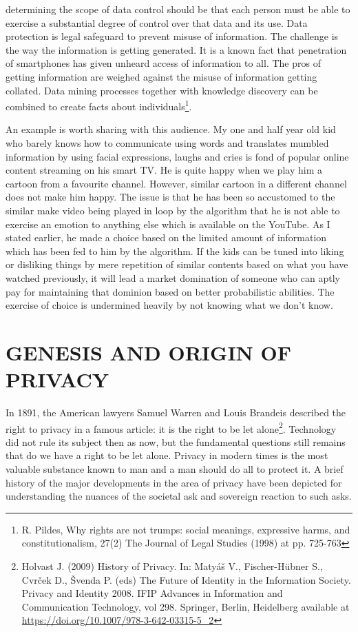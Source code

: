 \begin{multicols}{2}
determining the scope of data control should be that each person must be able to exercise a substantial degree of control over that data and its use. Data protection is legal safeguard to prevent misuse of information. The challenge is the way the information is getting generated. It is a known fact that penetration of smartphones has given unheard access of information to all. The pros of getting information are weighed against the misuse of information getting collated. Data mining processes together with knowledge discovery can be combined to create facts about individuals\footnote{R. Pildes, Why rights are not trumps: social meanings, expressive harms, and constitutionalism, 27(2) The Journal of Legal Studies (1998) at pp. 725-763}.

An example is worth sharing with this audience. My one and half year old kid who barely knows how to communicate using words and translates mumbled information by using facial expressions, laughs and cries is fond of popular online content streaming on his smart TV. He is quite happy when we play him a cartoon from a favourite channel. However, similar cartoon in a different channel does not make him happy. The issue is that he has been so accustomed to the similar make video being played in loop by the algorithm that he is not able to exercise an emotion to anything else which is available on the YouTube. As I stated earlier, he made a choice based on the limited amount of information which has been fed to him by the algorithm. If the kids can be tuned into liking or disliking things by mere repetition of similar contents based on what you have watched previously, it will lead a market domination of someone who can aptly pay for maintaining that dominion based on better probabilistic abilities. The exercise of choice is undermined heavily by not knowing what we don’t know.

\section{GENESIS AND ORIGIN OF\\ PRIVACY}

In 1891, the American lawyers Samuel Warren and Louis Brandeis described the right to privacy in a famous article: it is the right to be let alone\footnote{ Holvast J. (2009) History of Privacy. In: Matyáš V., Fischer-Hübner S., Cvrček D., Švenda P. (eds) The Future of Identity in the Information Society. Privacy and Identity 2008. IFIP Advances in Information and Communication Technology, vol 298. Springer, Berlin, Heidelberg available at \url{https://doi.org/10.1007/978-3-642-03315-5_2}}. Technology did not rule its subject then as now, but the fundamental questions still remains that do we have a right to be let alone. Privacy in modern times is the most valuable substance known to man and a man should do all to protect it. A brief history of the major developments in the area of privacy have been depicted for understanding the nuances of the societal ask and sovereign reaction to such asks.


\end{multicols}
